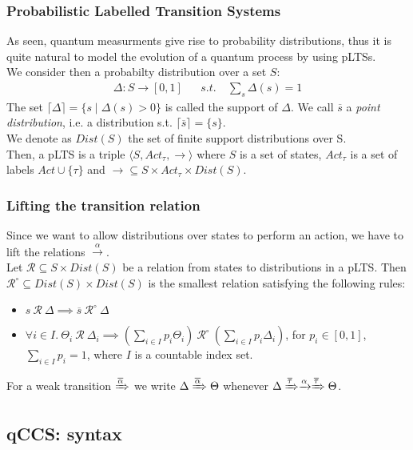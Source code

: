 \documentclass{beamer}
\begin{document}
\begin{frame}
\frametitle{Probabilistic Labelled Transition Systems}
As seen, quantum measurments give rise to probability distributions, thus it is quite natural to model the evolution of a quantum process by using pLTSs. \\
We consider then a probabilty distribution over a set $S$:
	\begin{align*}
		\Delta : S \rightarrow [0,1] & & s.t. \ & \sum_s \Delta(s) = 1
	\end{align*}
The set $\lceil \Delta \rceil = \{ s \mid \Delta(s) > 0 \}$ is called the support of 
$\Delta$. We call $\overline{s}$ a \emph{point distribution}, i.e. a distribution s.t. $\lceil \overline{s} \rceil = \{ s \}$. \\
We denote as $Dist(S)$ the set of finite support distributions over S. \\
Then, a pLTS is a triple $\langle S, Act_\tau, \rightarrow \rangle$ where $S$ is a set of states, $Act_\tau$ is a set of labels $Act \cup \{ \tau \}$ and $\rightarrow \subseteq S \times Act_\tau \times Dist(S)$.
\end{frame}

\begin{frame}
\frametitle{Lifting the transition relation}
Since we want to allow distributions over states to perform an action, we have to lift the relations $\xrightarrow\alpha$. \\
Let $\mathcal{R} \subseteq S \times Dist(S)$ be a relation from states to distributions in a pLTS. Then $\mathcal{R}^\circ \subseteq Dist(S) \times Dist(S)$ is the smallest relation satisfying the following rules:
	\begin{itemize}
		\item $s \ \mathcal{R} \ \Delta \implies \overline{s} \ \mathcal{R}^\circ \ \Delta$
		\item $\forall i \in I. \ \Theta_i \ \mathcal{R} \ \Delta_i \implies (\sum_{i \in I} p_i \Theta_i) \ \mathcal{R}^\circ \ (\sum_{i \in I} p_i \Delta_i)$, for $p_i \in [0,1]$, $\sum_{i \in I} p_i = 1$, where $I$ is a countable index set.
	\end{itemize}
For a weak transition $\xRightarrow{\overline{\alpha}}$ we write $\Delta \xRightarrow{\overline{\alpha}} \Theta$ whenever $\Delta \xRightarrow{\overline{\tau}} \xrightarrow\alpha \xRightarrow{\overline{\tau}} \Theta$.
\end{frame}

\subsection{qCCS: syntax}
\end{document}
